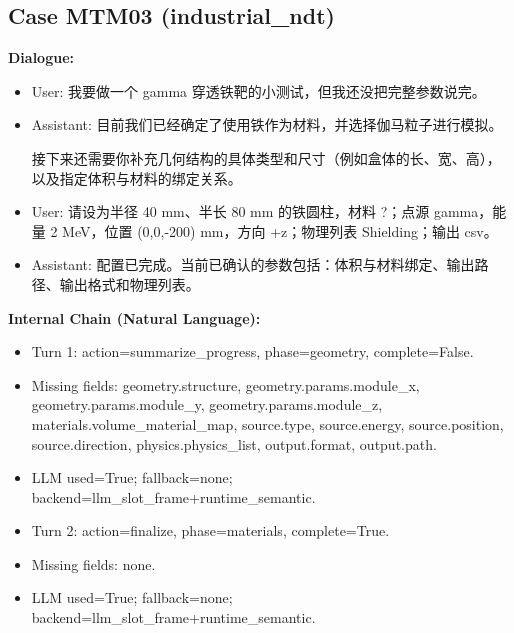 \documentclass[11pt]{ctexart}
\begin{document}
\subsection{Case MTM03 (industrial\_ndt)}
\textbf{Dialogue:}
\begin{itemize}
\item User: 我要做一个 gamma 穿透铁靶的小测试，但我还没把完整参数说完。
\item Assistant: 目前我们已经确定了使用铁作为材料，并选择伽马粒子进行模拟。

接下来还需要你补充几何结构的具体类型和尺寸（例如盒体的长、宽、高），以及指定体积与材料的绑定关系。
\item User: 请设为半径 40 mm、半长 80 mm 的铁圆柱，材料 ?；点源 gamma，能量 2 MeV，位置 (0,0,-200) mm，方向 +z；物理列表 Shielding；输出 csv。
\item Assistant: 配置已完成。当前已确认的参数包括：体积与材料绑定、输出路径、输出格式和物理列表。
\end{itemize}
\textbf{Internal Chain (Natural Language):}
\begin{itemize}
\item Turn 1: action=summarize\_progress, phase=geometry, complete=False.
\item Missing fields: geometry.structure, geometry.params.module\_x, geometry.params.module\_y, geometry.params.module\_z, materials.volume\_material\_map, source.type, source.energy, source.position, source.direction, physics.physics\_list, output.format, output.path.
\item LLM used=True; fallback=none; backend=llm\_slot\_frame+runtime\_semantic.
\item Turn 2: action=finalize, phase=materials, complete=True.
\item Missing fields: none.
\item LLM used=True; fallback=none; backend=llm\_slot\_frame+runtime\_semantic.
\end{itemize}
\end{document}
